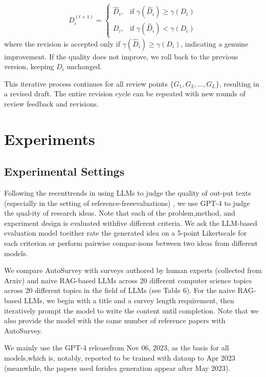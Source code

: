 \documentclass[manuscript,review,anonymous]{acmart}
\begin{document}
\begin{equation}
  D_i^{(t+1)} =
  \begin{cases}
      \hat{D}_i, & \text{if } \gamma(\hat{D}_i) \geq \gamma(D_i) \\
      D_i, & \text{if } \gamma(\hat{D}_i) < \gamma(D_i)
  \end{cases}
\end{equation}
where the revision is accepted only if $\gamma(\hat{D}_i) \geq \gamma(D_i)$, indicating a genuine improvement. If the quality does not improve, we roll back to the previous version, keeping $D_i$ unchanged.

This iterative process continues for all review points $\{G_1, G_2, \ldots, G_L\}$, resulting in a revised draft. The entire revision cycle can be repeated with new rounds of review feedback and revisions.

\section{Experiments}

\subsection{Experimental Settings}

Following the recenttrends in using LLMs to judge the quality of out-put texts (especially in the setting of reference-freeevaluations) \cite{zheng2023judging,liu2023g}, we use GPT-4 to judge the qual-ity of research ideas. Note that each of the problem,method, and experiment design is evaluated withfive different criteria. We ask the LLM-based evaluation model toeither rate the generated idea on a 5-point Likertscale for each criterion or perform pairwise compar-isons between two ideas from different models. 

We compare AutoSurvey with surveys authored by human experts (collected from Arxiv) and naive RAG-based LLMs across 20 different computer science topics across 20 different topics in
the field of LLMs (see Table 6). For the naive RAG-based LLMs, we begin with a title and a survey
length requirement, then iteratively prompt the model to write the content until completion. Note that we also provide the model with the same number of reference papers with AutoSurvey.

We mainly use the GPT-4 \cite{achiam2023gpt} releasefrom Nov 06, 2023, as the basis for all models,which is, notably, reported to be trained with dataup to Apr 2023 (meanwhile, the papers used foridea generation appear after May 2023).
\end{document}
